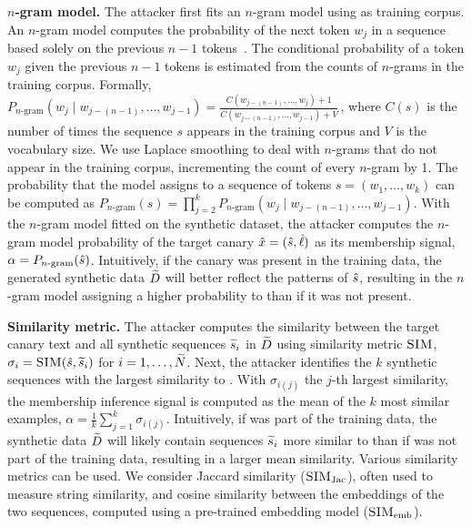 \textbf{$n$-gram model.} 
The attacker first fits an $n$-gram model using  as training corpus.
%
An $n$-gram model computes the probability of the next token $w_j$ in a sequence based solely on the previous $n-1$ tokens~\citep{jurafsky2024speech}.
%
The conditional probability of a token $w_j$ given the previous $n-1$ tokens is estimated from the counts of $n$-grams in the training corpus. 
%
Formally, $P_{\text{$n$-gram}}(w_j \!\mid\! w_{j-(n-1)}, \ldots, w_{j-1}) =
    \frac{C(w_{j-(n-1)}, \ldots, w_j) + 1}{C(w_{j-(n-1)}, \ldots, w_{j-1}) + V} \,$,
where $C(s)$ is the number of times the sequence $s$ appears in the training corpus and $V$ is the vocabulary size.
%
We use Laplace smoothing to deal with $n$-grams that do not appear in the training corpus, incrementing the count of every $n$-gram by 1.
The probability that the model assigns to a sequence of tokens $s = (w_1, \ldots, w_k)$ can be computed as
$P_{\text{$n$-gram}}(s) = \prod_{j=2}^{k} P_{\text{$n$-gram}}(w_j \mid w_{j-(n-1)}, \ldots, w_{j-1})$. 
%
With the $n$-gram model fitted on the synthetic dataset, the attacker computes the $n$-gram model probability of the target canary ${\hat{x}} = ({\hat{s}}, {\hat{\ell}})$ as its membership signal, \ie $\alpha = P_{\text{$n$-gram}}({\hat{s}})$. Intuitively, if the canary  was present in the training data, the generated synthetic data ${\widetilde{D}}$ will better reflect the patterns of ${\hat{s}}$, resulting in the $n$-gram model assigning a higher probability to  than if it was not present.


\textbf{Similarity metric.} 
The attacker computes the similarity between the target canary text  and all synthetic sequences ${\widetilde{s}}_i$ in ${\widetilde{D}}$ using similarity metric $\textsc{SIM}$, \ie $\sigma_i = \textsc{SIM}({\hat{s}}, {\widetilde{s}}_i)$ for $i = 1, \ldots, {\widetilde{N}}$. 
%
Next, the attacker identifies the $k$ synthetic sequences with the largest similarity to . With $\sigma_{i(j)}$ the $j$-th largest similarity, the membership inference signal is computed as the mean of the $k$ most similar examples, \ie $\alpha = \frac{1}{k} \sum_{j=1}^{k} \sigma_{i(j)}$. 
%
Intuitively, if  was part of the training data, the synthetic data ${\widetilde{D}}$ will likely contain sequences ${\widetilde{s}}_i$ more similar to  than if  was not part of the training data, resulting in a larger mean similarity.
%
Various similarity metrics can be used. We consider Jaccard similarity ($\textsc{SIM}_\textrm{Jac}$), often used to measure string similarity, and cosine similarity between the embeddings of the two sequences, computed using a pre-trained embedding model ($\textsc{SIM}_\textrm{emb}$).

